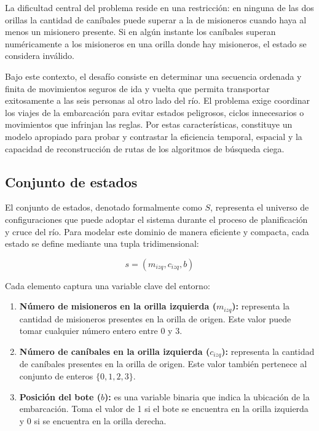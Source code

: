 \documentclass[
  spanish,
  11pt,
]{article}
\providecommand{\tightlist}{%
  \setlength{\itemsep}{0pt}\setlength{\parskip}{0pt}}
\begin{document}
La dificultad central del problema reside en una restricción: en ninguna
de las dos orillas la cantidad de caníbales puede superar a la de
misioneros cuando haya al menos un misionero presente. Si en algún
instante los caníbales superan numéricamente a los misioneros en una
orilla donde hay misioneros, el estado se considera inválido.

Bajo este contexto, el desafío consiste en determinar una secuencia
ordenada y finita de movimientos seguros de ida y vuelta que permita
transportar exitosamente a las seis personas al otro lado del río. El
problema exige coordinar los viajes de la embarcación para evitar
estados peligrosos, ciclos innecesarios o movimientos que infrinjan las
reglas. Por estas características, constituye un modelo apropiado para
probar y contrastar la eficiencia temporal, espacial y la capacidad de
reconstrucción de rutas de los algoritmos de búsqueda ciega.

\subsection{Conjunto de estados}\label{conjunto-de-estados}

El conjunto de estados, denotado formalmente como \(S\), representa el
universo de configuraciones que puede adoptar el sistema durante el
proceso de planificación y cruce del río. Para modelar este dominio de
manera eficiente y compacta, cada estado se define mediante una tupla
tridimensional:

\[
s = (m_{izq}, c_{izq}, b)
\]

Cada elemento captura una variable clave del entorno:

\begin{enumerate}
\def\labelenumi{\arabic{enumi}.}
\tightlist
\item
  \textbf{Número de misioneros en la orilla izquierda (\(m_{izq}\)):}
  representa la cantidad de misioneros presentes en la orilla de origen.
  Este valor puede tomar cualquier número entero entre 0 y 3.
\item
  \textbf{Número de caníbales en la orilla izquierda (\(c_{izq}\)):}
  representa la cantidad de caníbales presentes en la orilla de origen.
  Este valor también pertenece al conjunto de enteros \(\{0,1,2,3\}\).
\item
  \textbf{Posición del bote (\(b\)):} es una variable binaria que indica
  la ubicación de la embarcación. Toma el valor de 1 si el bote se
  encuentra en la orilla izquierda y 0 si se encuentra en la orilla
  derecha.
\end{enumerate}
\end{document}
